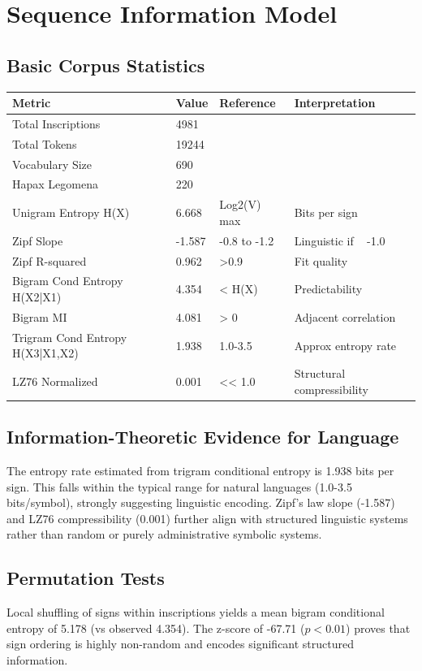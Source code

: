 \section{Sequence Information Model}

\subsection{Basic Corpus Statistics}
\begin{tabular}{llll}
\toprule
\textbf{Metric} & \textbf{Value} & \textbf{Reference} & \textbf{Interpretation} \\
\midrule
Total Inscriptions & 4981 &  &  \\
Total Tokens & 19244 &  &  \\
Vocabulary Size & 690 &  &  \\
Hapax Legomena & 220 &  &  \\
Unigram Entropy H(X) & 6.668 & Log2(V) max & Bits per sign \\
Zipf Slope & -1.587 & -0.8 to -1.2 & Linguistic if ~ -1.0 \\
Zipf R-squared & 0.962 & >0.9 & Fit quality \\
Bigram Cond Entropy H(X2|X1) & 4.354 & < H(X) & Predictability \\
Bigram MI & 4.081 & > 0 & Adjacent correlation \\
Trigram Cond Entropy H(X3|X1,X2) & 1.938 & 1.0-3.5 & Approx entropy rate \\
LZ76 Normalized & 0.001 & << 1.0 & Structural compressibility \\
\bottomrule
\end{tabular}

\subsection{Information-Theoretic Evidence for Language}
The entropy rate estimated from trigram conditional entropy is 1.938 bits per sign. This falls within the typical range for natural languages (1.0-3.5 bits/symbol), strongly suggesting linguistic encoding. Zipf's law slope (-1.587) and LZ76 compressibility (0.001) further align with structured linguistic systems rather than random or purely administrative symbolic systems.

\subsection{Permutation Tests}
Local shuffling of signs within inscriptions yields a mean bigram conditional entropy of 5.178 (vs observed 4.354). The z-score of -67.71 ($p < 0.01$) proves that sign ordering is highly non-random and encodes significant structured information.

